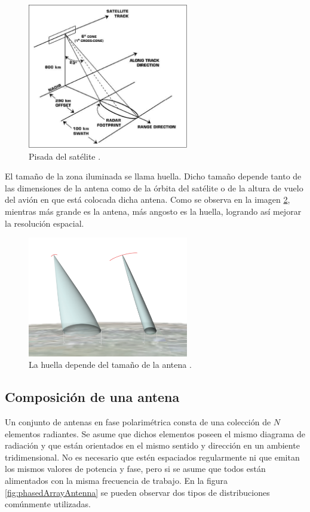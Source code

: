 \begin{figure}[H]
 \centering
 \includegraphics[width=7cm]{gfx/satellite.png}
 \caption{Pisada del satélite \cite{FootprintSatellite}.}
 \label{fig:antenna_ilumination}
\end{figure}

El tamaño de la zona iluminada se llama huella. Dicho tamaño depende tanto de las dimensiones de la antena como de la
órbita del satélite o de la altura de vuelo del avión en que está colocada dicha antena. Como se observa en la imagen
\ref{fig:footprint}, mientras más grande es la antena, más angosto es la huella, logrando así mejorar la resolución
espacial.

\begin{figure}[H]
 \centering
 \includegraphics[width=7cm]{gfx/footprint.png}
 \caption{La huella depende del tamaño de la antena \cite{FootprintAntenna}.}
 \label{fig:footprint}
\end{figure}

\subsection{Composición de una antena}

Un conjunto de antenas en fase polarimétrica consta de una colección de $N$ elementos radiantes. Se asume que dichos elementos
poseen el mismo diagrama de radiación y que están orientados en el mismo sentido y dirección en un ambiente tridimensional. No es
necesario que estén espaciados regularmente ni que emitan los mismos valores de potencia y fase, pero si se asume
que todos están alimentados con la misma frecuencia de trabajo. En la figura \ref{fig:phasedArrayAntenna} se pueden observar
dos tipos de distribuciones comúnmente utilizadas.

